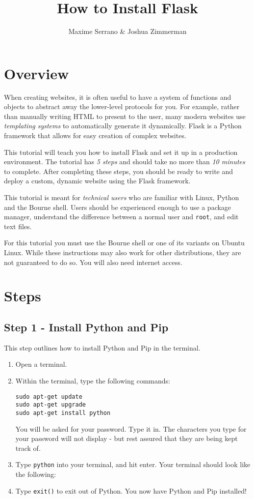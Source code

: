 \documentclass{article}
\title{How to Install Flask}
\author{Maxime Serrano \& Joshua Zimmerman}
\begin{document}
\maketitle
\section{Overview}
When creating websites, it is often useful to have a system of functions and objects
to abstract away the lower-level protocols for you. For example, rather than manually
writing HTML to present to the user, many modern websites use {\em templating systems}
to automatically generate it dynamically. Flask is a Python framework that allows
for easy creation of complex websites.

This tutorial will teach you how to install Flask and set it up in a production environment.
The tutorial has {\em 5 steps} and should take no more than {\em 10 minutes} to complete.
After completing these steps, you should be ready to write and deploy a custom, dynamic
website using the Flask framework.

This tutorial is meant for {\em technical users} who are familiar with Linux, Python and
the Bourne shell. Users should be experienced enough to use a package manager, understand
the difference between a normal user and \texttt{root}, and edit text files.

For this tutorial you must use the Bourne shell or one of its variants on Ubuntu Linux.
While these instructions may also work for other distributions, they are not guaranteed
to do so. You will also need internet access.

\pagebreak

\section{Steps}
\subsection{Step 1 - Install Python and Pip}
This step outlines how to install Python and Pip in the terminal.
\begin{enumerate}
\item Open a terminal.
\item Within the terminal, type the following commands:
\begin{verbatim}
sudo apt-get update
sudo apt-get upgrade
sudo apt-get install python
\end{verbatim}
You will be asked for your password. Type it in. The characters you type for your password
will not display - but rest assured that they are being kept track of.
\item Type \verb+python+ into your terminal, and hit enter. Your terminal should look like
the following:
\item Type \verb+exit()+ to exit out of Python. You now have Python and Pip installed!
\end{enumerate}
\end{document}
